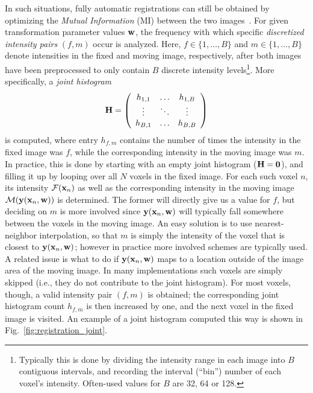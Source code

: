 \documentclass[10pt,twoside]{book}
\begin{document}
In such situations, fully automatic registrations can still be obtained by optimizing the \emph{Mutual Information} (MI) between the two images~\cite{wells1996multi,maes1997multimodality}. 
% 
For given transformation parameter values 
$\mathbf{w}$, the frequency with which specific \emph{discretized intensity pairs} $(f,m)$ occur 
is analyzed. 
%
Here, $f \in \{1, \ldots, B\}$ and $m \in \{1,\ldots,B\}$ denote intensities in the fixed and moving image, respectively, after both images have been preprocessed to only contain $B$ discrete intensity levels\footnote{Typically this is done by dividing the intensity range in each image into $B$ contiguous intervals, and recording the interval (``bin'') number of each voxel's intensity. Often-used values for $B$ are 32, 64 or 128.}.
%
More specifically, a \emph{joint histogram} 
$$
\mathbf{H}
=
\left(
\begin{array}{ccc}
h_{1,1} & \ldots & h_{1,B} \\ 
\vdots  & \ddots & \vdots \\
h_{B,1} & \ldots & h_{B,B}
\end{array}
\right)
$$
is computed,
where entry $h_{f,m}$ contains the number of times the intensity in the fixed image was $f$, while the corresponding intensity in the moving image was $m$. 
In practice, 
this is done by starting with an empty joint histogram 
($\mathbf{H} = \mathbf{0}$), 
and filling it up by looping over all $N$ voxels in the fixed image. For each such voxel 
$n$,
its intensity $\mathcal{F}(\mathbf{x}_n)$ as well as the corresponding intensity in the moving image $\mathcal{M}(\mathbf{y}(\mathbf{x}_n, \mathbf{w}))$ is determined.  
%
The former will directly give us a value for $f$, but deciding on $m$ is more involved since $\mathbf{y}(\mathbf{x}_n, \mathbf{w})$ will typically fall somewhere between the voxels
in the moving image.
An easy solution is to use nearest-neighbor interpolation, so that $m$ is simply the intensity of the voxel that is closest to $\mathbf{y}(\mathbf{x}_n, \mathbf{w})$; however in practice more involved schemes are typically used.
%
A related issue is what to do if $\mathbf{y}(\mathbf{x}_n, \mathbf{w})$ maps to a location outside of the image area of the moving image. In many implementations such voxels are simply skipped (i.e., they do not contribute to the joint histogram).
%
For most voxels, though,
a
valid intensity pair $(f,m)$ is obtained; 
the corresponding joint histogram count $h_{f,m}$ is then increased by one, and the next voxel in the fixed image is visited.
An example of a joint histogram computed this way is shown in Fig.~\ref{fig:registration_joint}.
\end{document}
